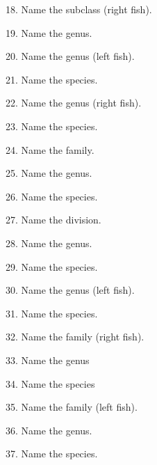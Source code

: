 \documentclass{article}
\begin{document}
{\newpage


18. Name the subclass (right fish).
\vspace{0.5\baselineskip}

19. Name the genus.
\vspace{2\baselineskip}
%

20. Name the genus (left fish).
\vspace{0.5\baselineskip}

21. Name the species.
\vspace{2\baselineskip}
%


22. Name the genus (right fish).
\vspace{0.5\baselineskip}

23. Name the species.
\vspace{2\baselineskip}
%

24. Name the family.
\vspace{0.5\baselineskip}

25. Name the genus.
\vspace{0.5\baselineskip}

26. Name the species.
\vspace{2\baselineskip}
%


27. Name the division.
\vspace{0.5\baselineskip}

28. Name the genus.
\vspace{0.5\baselineskip}

29. Name the species.
\vspace{2\baselineskip}
%


30. Name the genus (left fish).
\vspace{0.5\baselineskip}

31. Name the species.
\vspace{2\baselineskip}
%

32. Name the family (right fish).
\vspace{0.5\baselineskip}

33. Name the genus
\vspace{0.5\baselineskip}

34. Name the species
\vspace{2\baselineskip}
%
\newpage

35. Name the family (left fish).
\vspace{0.5\baselineskip}

36. Name the genus.
\vspace{0.5\baselineskip}

37. Name the species.
\vspace{2\baselineskip}


}
\end{document}
